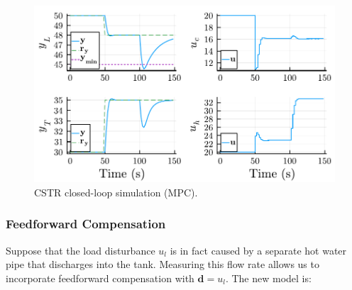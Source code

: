 \begin{figure}[ht]
    \centering
    \includegraphics[width=\columnwidth]{fig/plot_LinMPC1.pdf}
    \caption{CSTR closed-loop simulation (MPC).}\label{fig:plot_LinMPC1}
\end{figure}

\subsubsection{Feedforward Compensation}

Suppose that the load disturbance $u_l$ is in fact caused by a separate hot water pipe that discharges into the tank. Measuring this flow rate allows us to incorporate feedforward compensation with $\mathbf{d}=u_l$. The new model is:

